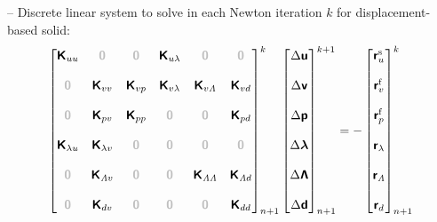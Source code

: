 \documentclass[a4paper,12pt]{report}
\newcommand{\bs}[1]{\boldsymbol{#1}}
\newcommand{\zerom}{\textcolor{lightgray}{\bs{\mathsf{0}}}}
\newcommand{\ROP}{\bs{\mathsf{r}}}
\newcommand{\LM}{\bs{\mathsf{\lambda}}}
\newcommand{\LMZ}{\bs{\mathsf{\Lambda}}}
\newcommand{\lmi}{\lambda} %
\newcommand{\lmzi}{\mathit{\Lambda}} %
\begin{document}
-- Discrete linear system to solve in each Newton iteration $k$ for displacement-based solid:
\begin{align}
\begin{bmatrix} \bs{\mathsf{K}}_{uu} & \zerom & \zerom & \bs{\mathsf{K}}_{u\lmi} & \zerom & \zerom \\ \\ \zerom & \bs{\mathsf{K}}_{vv} & \bs{\mathsf{K}}_{vp} & \bs{\mathsf{K}}_{v\lmi} & \bs{\mathsf{K}}_{v\lmzi} & \bs{\mathsf{K}}_{vd} \\ \\ \zerom & \bs{\mathsf{K}}_{pv} & \bs{\mathsf{K}}_{pp} & \zerom & \zerom & \bs{\mathsf{K}}_{pd} \\ \\ \bs{\mathsf{K}}_{\lmi u} & \bs{\mathsf{K}}_{\lmi v} & \zerom & \zerom & \zerom & \zerom \\ \\ \zerom & \bs{\mathsf{K}}_{\lmzi v} & \zerom & \zerom & \bs{\mathsf{K}}_{\lmzi \lmzi} & \bs{\mathsf{K}}_{\lmzi d} \\ \\ \zerom &  \bs{\mathsf{K}}_{dv}  & \zerom & \zerom & \zerom & \bs{\mathsf{K}}_{dd} \end{bmatrix}_{n+1}^{k}\begin{bmatrix} \Delta\bs{\mathsf{u}} \\ \\ \Delta\bs{\mathsf{v}} \\ \\ \Delta\bs{\mathsf{p}} \\ \\ \Delta\LM \\ \\ \Delta\LMZ \\ \\ \Delta\bs{\mathsf{d}} \end{bmatrix}_{n+1}^{k+1}=-\begin{bmatrix} \ROP_{u}^{\mathrm{s}} \\ \\ \ROP_{v}^{\mathrm{f}} \\ \\ \ROP_{p}^{\mathrm{f}} \\ \\ \ROP_{\lmi} \\ \\ \ROP_{\lmzi} \\ \\ \ROP_{d}\end{bmatrix}_{n+1}^{k} \label{eq:lin_sys_fsi_0d}
\end{align}
\end{document}

